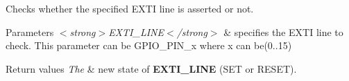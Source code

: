 Checks whether the specified E\+X\+TI line is asserted or not. 


\begin{DoxyParams}{Parameters}
{\em $<$strong$>$\+E\+X\+T\+I\+\_\+\+L\+I\+N\+E$<$/strong$>$} & specifies the E\+X\+TI line to check. This parameter can be G\+P\+I\+O\+\_\+\+P\+I\+N\+\_\+x where x can be(0..15) \\
\hline
\end{DoxyParams}

\begin{DoxyRetVals}{Return values}
{\em The} & new state of {\bfseries E\+X\+T\+I\+\_\+\+L\+I\+NE} (S\+ET or R\+E\+S\+ET). \\
\hline
\end{DoxyRetVals}

